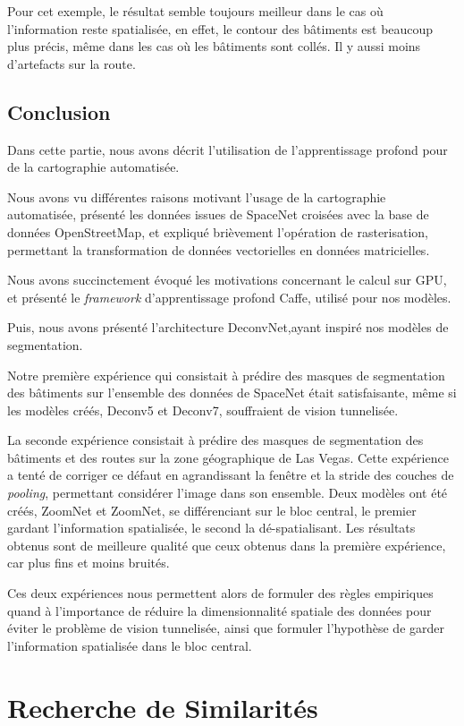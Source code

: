 \documentclass[a4paper, 11pt]{report}
\begin{document}
Pour cet exemple, le résultat semble toujours meilleur dans le cas où l'information reste spatialisée, en effet, le contour des bâtiments est beaucoup plus précis, même dans les cas où les bâtiments sont collés. Il y aussi moins d'artefacts sur la route.
\subsection{Conclusion}
Dans cette partie, nous avons décrit l'utilisation de l'apprentissage profond pour de la cartographie automatisée.

Nous avons vu différentes raisons motivant l'usage de la cartographie automatisée, présenté les données issues de SpaceNet croisées avec la base de données OpenStreetMap, et expliqué brièvement l'opération de rasterisation, permettant la transformation de données vectorielles en données matricielles.

Nous avons succinctement évoqué les motivations concernant le calcul sur GPU, et présenté le \emph{framework} d'apprentissage profond Caffe, utilisé pour nos modèles.

Puis, nous avons présenté l'architecture DeconvNet,ayant inspiré nos modèles de segmentation.

Notre première expérience qui consistait à prédire des masques de segmentation des bâtiments sur l'ensemble des données de SpaceNet était satisfaisante, même si les modèles créés, Deconv5 et Deconv7, souffraient de vision tunnelisée.

La seconde expérience consistait à prédire des masques de segmentation des bâtiments et des routes sur la zone géographique de Las Vegas.
Cette expérience a tenté de corriger ce défaut en agrandissant la fenêtre et la stride des couches de \emph{pooling}, permettant considérer l'image dans son ensemble.
Deux modèles ont été créés, ZoomNet et ZoomNet, se différenciant sur le bloc central, le premier gardant l'information spatialisée, le second la dé-spatialisant.
Les résultats obtenus sont de meilleure qualité que ceux obtenus dans la première expérience, car plus fins et moins bruités.

Ces deux expériences nous permettent alors de formuler des règles empiriques quand à l'importance de réduire la dimensionnalité spatiale des données pour éviter le problème de vision tunnelisée, ainsi que formuler l'hypothèse de garder l'information spatialisée dans le bloc central.
\section{Recherche de Similarités}
\end{document}
